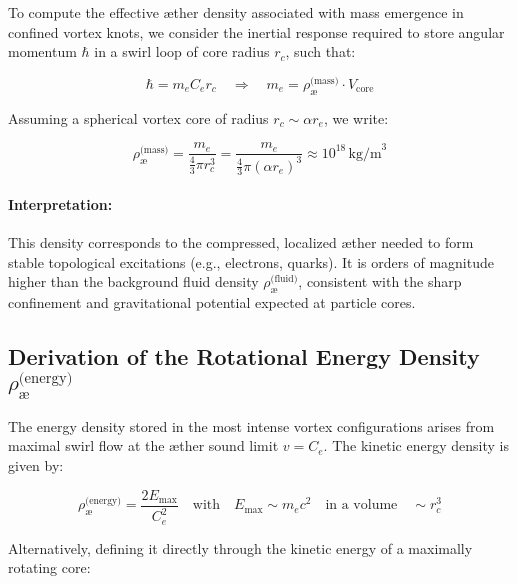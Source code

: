 \documentclass[preprint]{revtex4-2}
\begin{document}
                To compute the effective æther density associated with mass emergence in confined vortex knots, we consider the inertial response required to store angular momentum \( \hbar \) in a swirl loop of core radius \( r_c \), such that:
        
                \[
                \hbar = m_e C_e r_c
                \quad \Rightarrow \quad
                m_e = \rho_{\text{\ae}}^{\text{(mass)}} \cdot V_{\text{core}}
                \]
        
                Assuming a spherical vortex core of radius \( r_c \sim \alpha r_e \), we write:
        
                \[
                \rho_{\text{\ae}}^{\text{(mass)}} = \frac{m_e}{\frac{4}{3} \pi r_c^3}
                = \frac{m_e}{\frac{4}{3} \pi (\alpha r_e)^3}
                \approx 10^{18} \, \text{kg/m}^3
                \]
        
                \paragraph{Interpretation:}
                This density corresponds to the compressed, localized æther needed to form stable topological excitations (e.g., electrons, quarks). It is orders of magnitude higher than the background fluid density \( \rho_{\text{\ae}}^{\text{(fluid)}} \), consistent with the sharp confinement and gravitational potential expected at particle cores.
        
                \subsection{Derivation of the Rotational Energy Density \boldmath\( \rho_{\text{\ae}}^{\text{(energy)}} \)}
        
                The energy density stored in the most intense vortex configurations arises from maximal swirl flow at the æther sound limit \( v = C_e \). The kinetic energy density is given by:
        
                \[
                    \rho_{\text{\ae}}^{\text{(energy)}} = \frac{2 E_{\text{max}}}{C_e^2}
                    \quad \text{with} \quad
                    E_{\text{max}} \sim m_e c^2 \quad \text{in a volume} \quad \sim r_c^3
                \]
        
                Alternatively, defining it directly through the kinetic energy of a maximally rotating core:
        
\end{document}
